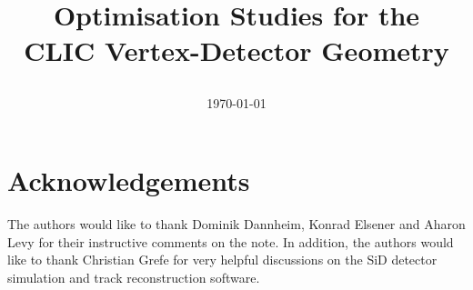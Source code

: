 \documentclass[11pt,a4paper]{scrartcl}
\title{\begin{center}Optimisation Studies for the \\
CLIC Vertex-Detector Geometry \end{center}}
\date{\today}
\begin{document}
\titlepage

%

\tableofcontents 
\newpage
%

%

%

%

%
\newpage

%
%

%

%
\section{Acknowledgements}
The authors would like to thank Dominik Dannheim, Konrad Elsener and Aharon Levy for their instructive comments on the note. In addition, the authors would like to thank Christian Grefe for very helpful discussions on the SiD detector simulation and track reconstruction software.
\newpage


\newpage
\printbibliography[title=References]
\end{document}
